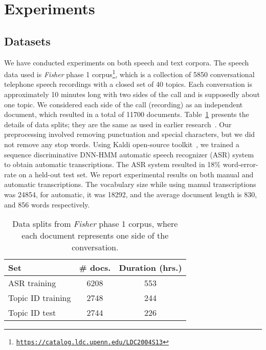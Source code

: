 \documentclass[journal]{IEEEtran}
\begin{document}
\section{Experiments}
\label{sec:exp}
\subsection{Datasets}
\label{ssec:data}
We have conducted experiments on both speech and text corpora. The speech 
data used is \textit{Fisher} phase 1 
corpus\footnote{\texttt{\url{https://catalog.ldc.upenn.edu/LDC2004S13}}}, 
which is a collection of 5850 conversational telephone speech recordings with
a closed set of 40 topics. Each conversation is approximately 10 minutes long
with two sides of the call and is supposedly about one topic.
We considered each side of the call (recording) as an independent document,
which resulted in a total of 11700 documents. Table~\ref{tab:data} presents
the details of data splits; they are the same as used in earlier
research~\cite{Hazen:2007:ASRU,Hazen:2011:MCE_topic_ID,May:2015:mivec}. Our
preprocessing involved removing punctuation and special characters, but we
did not remove any stop words. Using Kaldi open-source
toolkit~\cite{Kaldi:2011:ASRU}, we trained a sequence discriminative DNN-HMM
automatic speech recognizer (ASR) system~\cite{Karel:2013} to obtain
automatic transcriptions. The ASR system resulted in 18\% word-error-rate on
a held-out test set. We report experimental results on both manual and
automatic transcriptions. The vocabulary size while using manual
transcriptions was 24854, for automatic, it was 18292, and the average
document length is 830, and 856 words respectively.
\begin{table}[t!]
  \begin{center}
    \caption{\label{tab:data}Data splits from \textit{Fisher} phase 1 corpus, 
    where each document represents one side of the conversation.}
    \begin{tabular}{lcc} \toprule
      \bf{Set} & \bf{\# docs.} & \bf{Duration (hrs.)}  \\ \midrule
      ASR training      & 6208 & 553 \\
      Topic ID training & 2748 & 244 \\
      Topic ID test     & 2744 & 226 \\ \bottomrule
    \end{tabular}
  \end{center}
\end{table}
\end{document}
